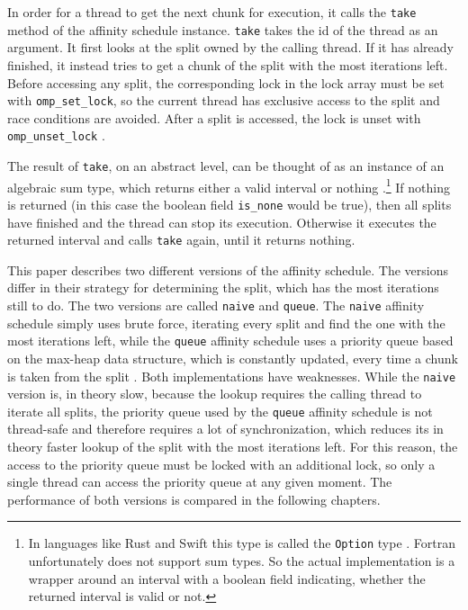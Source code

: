 \documentclass[twoside,11pt]{article}
\begin{document}
In order for a thread to get the next chunk for execution,
it calls the \texttt{take} method of the affinity schedule
instance.
\texttt{take} takes the id of the thread as an argument.
It first looks at the split owned by the calling thread.
If it has already finished, it instead tries to get a
chunk of the split with the most iterations left.
Before accessing any split, the corresponding lock in the
lock array must be set with \texttt{omp\_set\_lock}, so
the current thread has exclusive access to the split and
race conditions are avoided.
After a split is accessed, the lock is unset with
\texttt{omp\_unset\_lock} \citep[see][Chapter 3]{omp}.

The result of \texttt{take}, on an abstract level, can be
thought of as an instance of an algebraic sum type, which
returns either a valid interval or nothing
\citep[for sum types see e.g.][]{sum_types}.\footnote{%
  In languages like Rust and Swift this type is called the
  \texttt{Option} type \citep[see][]{rust, swift}.
  Fortran unfortunately does not support sum types. So
  the actual implementation is a wrapper around an interval
  with a boolean field indicating, whether the returned
  interval is valid or not.}
If nothing is returned (in this case the boolean field
\texttt{is\_none} would be true), then all splits have
finished and the thread can stop its execution.
Otherwise it executes the returned interval and calls
\texttt{take} again, until it returns nothing.

This paper describes two different versions of the affinity
schedule.
The versions differ in their strategy for determining the
split, which has the most iterations still to do.
The two versions are called \texttt{naive} and
\texttt{queue}.
The \texttt{naive} affinity schedule simply uses brute
force, iterating every split and find the one with the most
iterations left, while the \texttt{queue} affinity schedule
uses a priority queue based on the max-heap data structure,
which is constantly updated, every time a chunk is taken
from the split \citep[for the max-heap data structure see
e.g.][Chapter 6]{cormen}.
Both implementations have weaknesses.
While the \texttt{naive} version is, in theory slow,
because the lookup requires the calling thread to iterate
all splits, the priority queue used by the \texttt{queue}
affinity schedule is not thread-safe and therefore requires
a lot of synchronization, which reduces its in theory
faster lookup of the split with the most iterations left.
For this reason, the access to the priority queue must be
locked with an additional lock, so only
a single thread can access the priority queue at any given
moment.
The performance of both versions is compared in the
following chapters.
\end{document}
